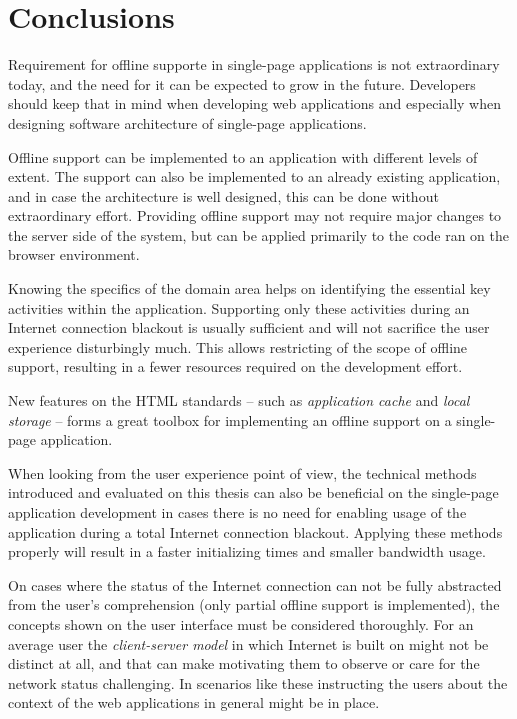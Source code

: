 
\chapter{Conclusions}

Requirement for offline supporte in single-page applications is not extraordinary today, and the need for it can be expected to grow in the future. Developers should keep that in mind when developing web applications and especially when designing software architecture of single-page applications.

Offline support can be implemented to an application with different levels of extent. The support can also be implemented to an already existing application, and in case the architecture is well designed, this can be done without extraordinary effort. Providing offline support may not require major changes to the server side of the system, but can be applied primarily to the code ran on the browser environment.

Knowing the specifics of the domain area helps on identifying the essential key activities within the application. Supporting only these activities during an Internet connection blackout is usually sufficient and will not sacrifice the user experience disturbingly much. This allows restricting of the scope of offline support, resulting in a fewer resources required on the development effort.

New features on the HTML standards -- such as \textit{application cache} and \textit{local storage} -- forms a great toolbox for implementing an offline support on a single-page application.

When looking from the user experience point of view, the technical methods introduced and evaluated on this thesis can also be beneficial on the single-page application development in cases there is no need for enabling usage of the application during a total Internet connection blackout. Applying these methods properly will result in a faster initializing times and smaller bandwidth usage.

On cases where the status of the Internet connection can not be fully abstracted from the user's comprehension (only partial offline support is implemented), the concepts shown on the user interface must be considered thoroughly. For an average user the \textit{client-server model} in which Internet is built on might not be distinct at all, and that can make motivating them to observe or care for the network status challenging. In scenarios like these instructing the users about the context of the web applications in general might be in place.
